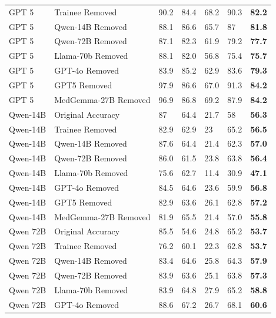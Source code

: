 \documentclass[11pt]{article}
\begin{document}
\begin{longtable}{lllllll}
GPT 5 & Trainee Removed & 90.2 & 84.4 & 68.2 & 90.3 & \textbf{82.2} \\
GPT 5 & Qwen-14B Removed & 88.1 & 86.6 & 65.7 & 87 & \textbf{81.8} \\
GPT 5 & Qwen-72B Removed & 87.1 & 82.3 & 61.9 & 79.2 & \textbf{77.7} \\
GPT 5 & Llama-70b Removed & 88.1 & 82.0 & 56.8 & 75.4 & \textbf{75.7} \\
GPT 5 & GPT-4o Removed & 83.9 & 85.2 & 62.9 & 83.6 & \textbf{79.3} \\
GPT 5 & GPT5 Removed & 97.9 & 86.6 & 67.0 & 91.3 & \textbf{84.2} \\
\rowcolor[HTML]{FFFFFF} 
GPT 5 & MedGemma-27B Removed & 96.9 & 86.8 & 69.2 & 87.9 & \textbf{84.2} \\
\midrule
Qwen-14B & Original Accuracy & 87 & 64.4 & 21.7 & 58 & \textbf{56.3} \\
Qwen-14B & Trainee Removed & 82.9 & 62.9 & 23 & 65.2 & \textbf{56.5} \\
Qwen-14B & Qwen-14B Removed & 87.6 & 64.4 & 21.4 & 62.3 & \textbf{57.0} \\
Qwen-14B & Qwen-72B Removed & 86.0 & 61.5 & 23.8 & 63.8 & \textbf{56.4} \\
Qwen-14B & Llama-70b Removed & 75.6 & 62.7 & 11.4 & 30.9 & \textbf{47.1} \\
Qwen-14B & GPT-4o Removed & 84.5 & 64.6 & 23.6 & 59.9 & \textbf{56.8} \\
Qwen-14B & {\color[HTML]{FF0000} GPT5 Removed} & {\color[HTML]{FF0000} 82.9} & {\color[HTML]{FF0000} 63.6} & {\color[HTML]{FF0000} 26.1} & {\color[HTML]{FF0000} 62.8} & {\color[HTML]{FF0000} \textbf{57.2}} \\
Qwen-14B & MedGemma-27B Removed & 81.9 & 65.5 & 21.4 & 57.0 & \textbf{55.8} \\
\midrule
\rowcolor[HTML]{FFFFFF} 
Qwen 72B & Original Accuracy & 85.5 & 54.6 & 24.8 & 65.2 & \textbf{53.7} \\
Qwen 72B & Trainee Removed & 76.2 & 60.1 & 22.3 & 62.8 & \textbf{53.7} \\
Qwen 72B & Qwen-14B Removed & 83.4 & 64.6 & 25.8 & 64.3 & \textbf{57.9} \\
Qwen 72B & Qwen-72B Removed & 83.9 & 63.6 & 25.1 & 63.8 & \textbf{57.3} \\
Qwen 72B & Llama-70b Removed & 83.9 & 64.8 & 27.9 & 65.2 & \textbf{58.8} \\
Qwen 72B & {\color[HTML]{FF0000} GPT-4o Removed} & {\color[HTML]{FF0000} 88.6} & {\color[HTML]{FF0000} 67.2} & {\color[HTML]{FF0000} 26.7} & {\color[HTML]{FF0000} 68.1} & {\color[HTML]{FF0000} \textbf{60.6}} \\

\end{longtable}
\end{document}
